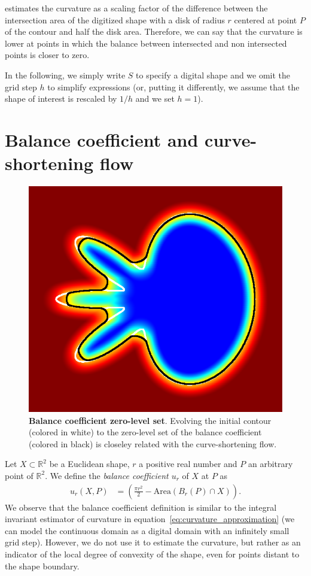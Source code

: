 \documentclass[review]{siamart220329}
\newcommand{\R}{\mathbb{R}}
\begin{document}
 estimates the curvature as a scaling factor of the difference between the intersection area of the digitized shape with a disk of radius $r$ centered at point $P$ of the contour and half the disk area. Therefore, we can say that the curvature is lower at points in which the balance between intersected and non intersected points is closer to zero.

In the following, we simply write $S$ to specify a digital shape and we omit the grid step $h$ to simplify expressions (or, putting it differently, we assume that the shape of interest is rescaled by $1/h$ and we set $h = 1$).
%
%
%
%
%
\section{Balance coefficient and curve-shortening flow}
%
%
\begin{figure}
 \center
 \includegraphics[scale=0.32]{figures/zero-level-set/balance-coefficient-zero-level-set.png}
 \caption{\textbf{Balance coefficient zero-level set}. Evolving the initial contour (colored in white) to the zero-level set of the balance coefficient (colored in black) is closeley related with the curve-shortening flow.}
 \label{fig:balance-coefficient-zero-level-set}
 \end{figure}
%
%
Let $X \subset \R^2$ be a Euclidean shape, $r$ a positive real number and $P$ an arbitrary point of $\R^2$. We define the \emph{balance coefficient $u_r$} of $X$ at $P$ as
%
%
\begin{align*}
  u_r(X,P) &= \left( \frac{\pi r^2}{2} - \text{Area}(B_r(P) \cap X) \right).
\end{align*}
%
%
We observe that the balance coefficient definition is similar to the
integral invariant estimator of curvature in
equation~\eqref{eq:curvature_approximation} (we can model the
continuous domain as a digital domain with an infinitely small grid
step). However, we do not use it to estimate the curvature, but rather
as an indicator of the local degree of convexity of the shape, even for points distant to the shape boundary.
\end{document}
